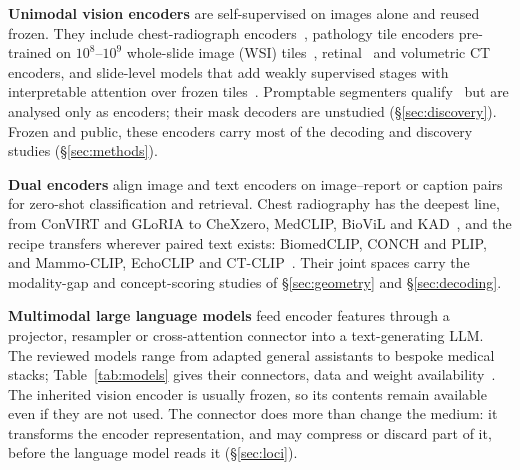 \textbf{Unimodal vision encoders} are self-supervised on images alone and reused frozen. They include chest-radiograph
encoders~\cite{sellergren2022simplified,perezgarcia2024scalable}, pathology tile encoders pre-trained on
$10^{8}$--$10^{9}$ whole-slide image (WSI)
tiles~\cite{chen2024generalpurpose,vorontsov2024model,xu2024wholeslide,zimmermann2024virchow2,filiot2024phikon},
retinal~\cite{zhou2023model} and volumetric CT~\cite{blankemeier2024merlin} encoders, and slide-level models
that add weakly supervised stages with interpretable attention over frozen
tiles~\cite{wang2024pathology,ding2024whole}. Promptable segmenters
qualify~\cite{ma2023anything,zhao2024foundation} but are analysed only as encoders; their mask decoders
are unstudied (\S\ref{sec:discovery}). Frozen and public, these encoders carry most of the decoding and
discovery studies (\S\ref{sec:methods}).

\textbf{Dual encoders} align image and text encoders on image--report or caption pairs for zero-shot
classification and retrieval. Chest radiography has the deepest line, from ConVIRT and GLoRIA to CheXzero,
MedCLIP, BioViL and KAD~\cite{zhang2020visual,huang2021gloria,tiu2022detection,wang2022medclip,boecking2022most,zhang2023visuallanguage},
and the recipe transfers wherever paired text exists: BiomedCLIP, CONCH and PLIP, and Mammo-CLIP,
EchoCLIP and
CT-CLIP~\cite{zhang2023biomedclip,lu2024visuallanguage,huang2023visual,ghosh2024mammoclip,christensen2024vision,hamamci2024ctrate}.
Their joint spaces carry the modality-gap and concept-scoring studies of \S\ref{sec:geometry} and
\S\ref{sec:decoding}.

\textbf{Multimodal large language models} feed encoder features through a projector, resampler or
cross-attention connector into a text-generating LLM. The reviewed models range from adapted general
assistants to bespoke medical stacks; Table~\ref{tab:models} gives their connectors, data and weight
availability~\cite{li2023llavamed,moor2023medflamingo,bannur2024maira2,chen2024model,chaves2024clinically,wu2023model,chen2024huatuogptvision,tu2023biomedical,sellergren2025medgemma,team2025lingshu}.
The inherited vision encoder is usually frozen, so its contents remain available even if they are not
used. The connector does more than change the medium: it transforms the encoder representation, and may
compress or discard part of it, before the language model reads it (\S\ref{sec:loci}).

